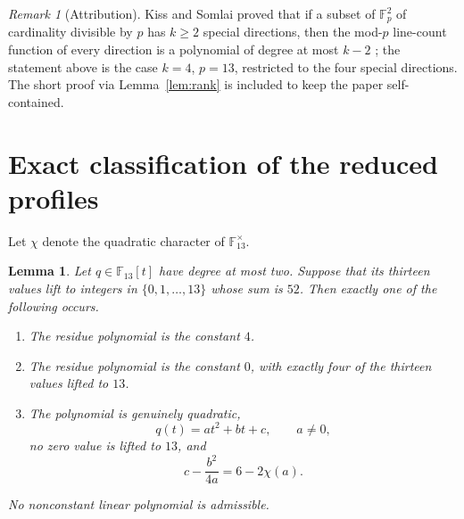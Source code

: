 \documentclass[11pt]{amsart}
\newtheorem{lemma}[theorem]{Lemma}
\theoremstyle{remark}
\newtheorem{remark}[theorem]{Remark}
\newcommand{\F}{\mathbb F}
\begin{document}
\begin{remark}[Attribution]\label{rem:attribution}
Kiss and Somlai proved that if a
subset of $\F_p^{2}$ of cardinality divisible by $p$ has $k\ge2$ special
directions, then the mod-$p$ line-count function of every direction is a
polynomial of degree at most $k-2$
\cite[Proposition~3.1]{KissSomlaiSpecialDirections}; the statement above is
the case $k=4$, $p=13$, restricted to the four special directions.  The
short proof via Lemma~\ref{lem:rank} is included to keep the paper
self-contained.
\end{remark}

\section{Exact classification of the reduced profiles}\label{sec:profiles}

Let $\chi$ denote the quadratic character of $\F_{13}^{\times}$.

\begin{lemma}\label{lem:profiles}
Let $q\in\F_{13}[t]$ have degree at most two.  Suppose that its thirteen
values lift to integers in $\{0,1,\ldots,13\}$ whose sum is $52$.
Then exactly one of the following occurs.
\begin{enumerate}
\item The residue polynomial is the constant $4$.
\item The residue polynomial is the constant $0$, with exactly four of the
      thirteen values lifted to $13$.
\item The polynomial is genuinely quadratic,
      \[
        q(t)=at^2+bt+c,
        \qquad a\ne0,
      \]
      no zero value is lifted to $13$, and
      \begin{equation}\label{eq:vertex-condition}
        c-\frac{b^2}{4a}=6-2\chi(a).
      \end{equation}
\end{enumerate}
No nonconstant linear polynomial is admissible.
\end{lemma}
\end{document}
